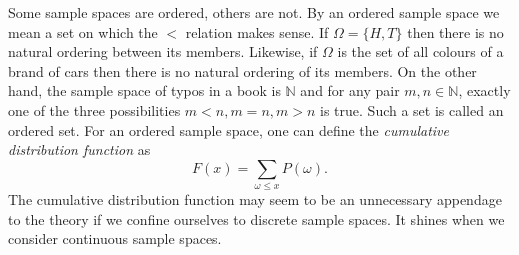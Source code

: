 \documentclass{article}
\begin{document}
\begin{enumerate}
Some sample spaces are ordered, others are not. By an ordered sample space
we mean a set on which the $<$ relation makes sense. If $\Omega = \{H, T\}$
then there is no natural ordering between its members. Likewise, if 
$\Omega$ is the set of all colours of a brand of cars then there is no
natural ordering of its members. On the other hand, the sample space of
typos in a book is $\mathbb{N}$ and for any pair $m, n \in \mathbb{N}$, 
exactly one of the three possibilities $m < n, m = n, m > n$ is true. Such
a set is called an ordered set. For an ordered sample space, one can 
define the \emph{cumulative distribution function} as
\begin{equation}\label{e13}
F(x) = \sum_{\omega \le x}P(\omega).
\end{equation}
The cumulative distribution function may seem to be an unnecessary 
appendage to the theory if we confine ourselves to discrete sample spaces.
It shines when we consider continuous sample spaces.


\end{enumerate}
\end{document}
